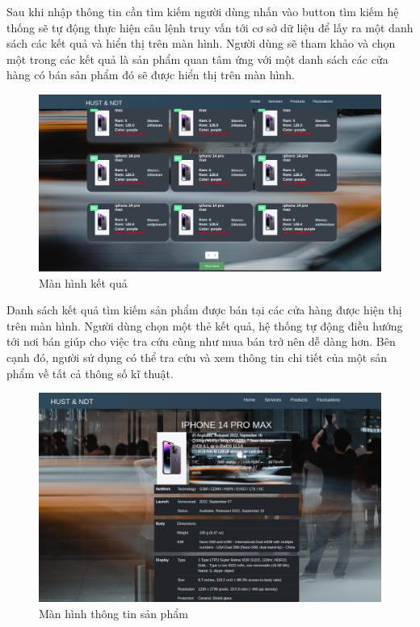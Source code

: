 \documentclass[../DoAn.tex]{subfiles}
\begin{document}
Sau khi nhập thông tin cần tìm kiếm người dùng nhấn vào button tìm kiếm hệ thống sẽ tự động thực hiện câu lệnh truy vấn tới cơ sở dữ liệu để lấy ra một danh sách các kết quả và hiển thị trên màn hình. Người dùng sẽ tham khảo và chọn một trong các kết quả là sản phẩm quan tâm ứng với một danh sách các cửa hàng có bán sản phẩm đó sẽ được hiển thị trên màn hình.

\begin{figure}[H]
    \centering
    \includegraphics[scale=0.24]{Hinhve/searchUI_2.png}
    \caption{Màn hình kết quả}
    \label{fig:my_label2}
\end{figure}

Danh sách kết quả tìm kiếm sản phẩm được bán tại các cửa hàng được hiện thị trên màn hình. Người dùng chọn một thẻ kết quả, hệ thống tự động điều hướng tới nơi bán giúp cho việc tra cứu cũng như mua bán trở nên dễ dàng hơn. Bên cạnh đó,  người sử dụng có thể tra cứu và xem thông tin chi tiết của một sản phẩm về tất cả thông số kĩ thuật.

\begin{figure}[H]
    \centering
    \includegraphics[scale=0.28]{Hinhve/info_UI.png}
    \caption{Màn hình thông tin sản phẩm}
    \label{fig:my_label2}
\end{figure}
\end{document}
